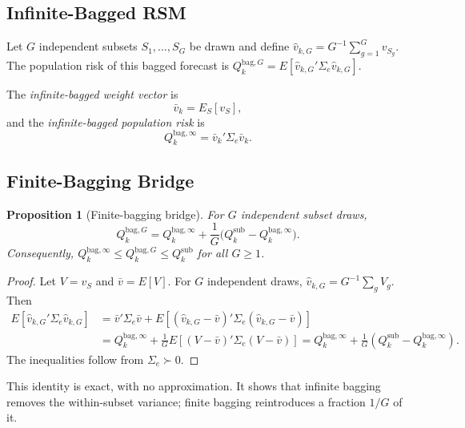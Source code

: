 \documentclass[12pt,a4paper]{article}
\newtheorem{proposition}{Proposition}
\theoremstyle{definition}
\begin{document}
\subsection{Infinite-Bagged RSM}

Let $G$ independent subsets $S_1,\ldots,S_G$ be drawn and define
$\hat v_{k,G}=G^{-1}\sum_{g=1}^G v_{S_g}$. The population risk of
this bagged forecast is $Q_k^{\mathrm{bag},G}=E[\hat v_{k,G}'\Sigma_e\hat v_{k,G}]$.

The \emph{infinite-bagged weight vector} is
\begin{equation}
\bar v_k = E_S[v_S],
\end{equation}
and the \emph{infinite-bagged population risk} is
\begin{equation}\label{eq:Qbag}
Q_k^{\mathrm{bag},\infty} = \bar v_k'\Sigma_e\bar v_k.
\end{equation}

\subsection{Finite-Bagging Bridge}

\begin{proposition}[Finite-bagging bridge]\label{prop:bridge}
For $G$ independent subset draws,
\begin{equation}\label{eq:bridge}
Q_k^{\mathrm{bag},G}
= Q_k^{\mathrm{bag},\infty}
+ \frac{1}{G}\bigl(Q_k^{\mathrm{sub}}-Q_k^{\mathrm{bag},\infty}\bigr).
\end{equation}
Consequently, $Q_k^{\mathrm{bag},\infty}\leq Q_k^{\mathrm{bag},G}\leq Q_k^{\mathrm{sub}}$
for all $G\geq 1$.
\end{proposition}

\begin{proof}
Let $V=v_S$ and $\bar v=E[V]$. For $G$ independent draws,
$\hat v_{k,G}=G^{-1}\sum_g V_g$. Then
\begin{align*}
E[\hat v_{k,G}'\Sigma_e\hat v_{k,G}]
&= \bar v'\Sigma_e\bar v + E[(\hat v_{k,G}-\bar v)'\Sigma_e(\hat v_{k,G}-\bar v)]\\
&= Q_k^{\mathrm{bag},\infty} + \frac{1}{G}E[(V-\bar v)'\Sigma_e(V-\bar v)]
= Q_k^{\mathrm{bag},\infty} + \frac{1}{G}(Q_k^{\mathrm{sub}}-Q_k^{\mathrm{bag},\infty}).
\end{align*}
The inequalities follow from $\Sigma_e\succ 0$.
\end{proof}

This identity is exact, with no approximation. It shows that infinite bagging
removes the within-subset variance; finite bagging reintroduces a fraction
$1/G$ of it.
\end{document}
